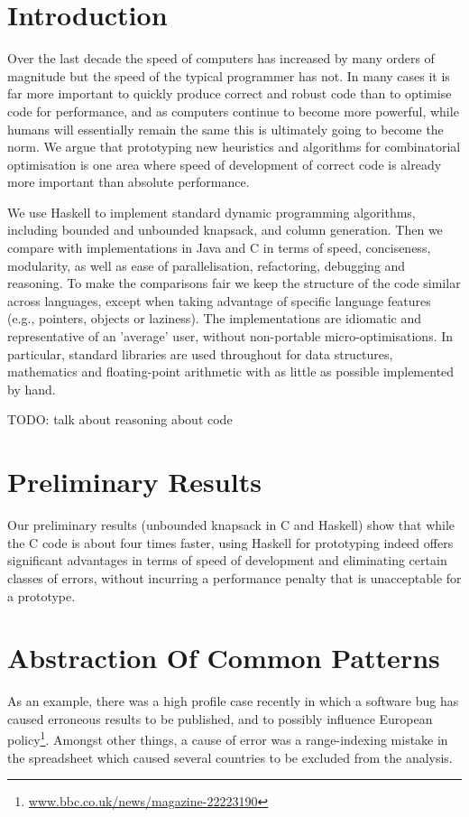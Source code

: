 \documentclass[smallextended]{svjour3}       %
\begin{document}
\section{Introduction}

Over the last decade the speed of computers has increased by many orders of
magnitude but the speed of the typical programmer has not. In many cases it is far more important to quickly produce correct and robust
code than to optimise code for performance, and as computers continue to
become more powerful, while humans will essentially remain the same this is
ultimately going to become the norm. We argue that prototyping new heuristics
and algorithms for combinatorial optimisation is one area where speed of
development of correct code is already more important than absolute
performance.

We use Haskell to implement standard dynamic programming algorithms, including
bounded and unbounded knapsack, and column generation. Then we
compare with implementations in Java and C in terms of speed, conciseness,
modularity, as well as ease of parallelisation, refactoring, debugging and
reasoning. To make the comparisons fair we keep the structure of the code
similar across languages, except when taking advantage of specific language
features (e.g., pointers, objects or laziness). The implementations are
idiomatic and representative of an 'average' user, without non-portable micro-optimisations. In particular, standard libraries are used throughout for
data structures, mathematics and floating-point arithmetic with as little as possible implemented by hand.

TODO: talk about reasoning about code

\section{Preliminary Results}
Our preliminary results (unbounded knapsack in C and Haskell) show that while
the C code is about four times faster, using Haskell for prototyping indeed
offers significant advantages in terms of speed of development and eliminating
certain classes of errors, without incurring a performance penalty that is
unacceptable for a prototype.

\section{Abstraction Of Common Patterns}
As an example, there was a high profile case recently\cite{Herndon13} in which a
software bug has caused erroneous results to be published, and to possibly influence European policy\footnote{\url{www.bbc.co.uk/news/magazine-22223190}}. Amongst other things, a cause of error was a range-indexing mistake in the spreadsheet which caused several countries to be excluded from the analysis.
\end{document}
